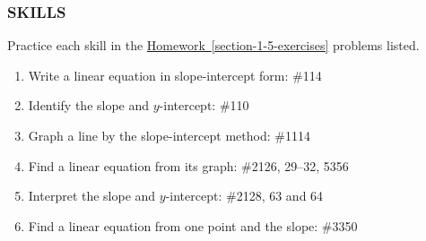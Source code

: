 \documentclass[10pt,]{book}
\theoremstyle{plain}
\theoremstyle{definition}
\theoremstyle{definition}
\theoremstyle{definition}
\theoremstyle{definition}
\numberwithin{equation}{part}
\begin{document}
\subsubsection[{SKILLS}]{SKILLS}\label{subsubsection-20}
Practice each skill in the \hyperref[section-1-5-exercises]{Homework~\ref{section-1-5-exercises}} problems listed. \leavevmode%
\begin{enumerate}[label=\arabic*]
\item\hypertarget{li-1141}{}Write a linear equation in slope-intercept form: \#1\textendash{}14%
\item\hypertarget{li-1142}{}Identify the slope and \(y\)-intercept: \#1\textendash{}10%
\item\hypertarget{li-1143}{}Graph a line by the slope-intercept method: \#11\textendash{}14%
\item\hypertarget{li-1144}{}Find a linear equation from its graph: \#21\textendash{}26, 29–32, 53\textendash{}56%
\item\hypertarget{li-1145}{}Interpret the slope and \(y\)-intercept: \#21\textendash{}28, 63 and 64%
\item\hypertarget{li-1146}{}Find a linear equation from one point and the slope: \#33\textendash{}50%
\end{enumerate}
%
\typeout{************************************************}
\typeout{************************************************}
\end{document}
